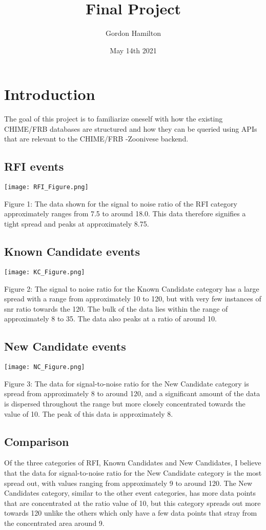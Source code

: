 \documentclass{article}
\title{Final Project}
\author{Gordon Hamilton}
\date{May 14th 2021}
\begin{document}
\maketitle

\section{Introduction}

The goal of this project is to familiarize oneself with how the existing CHIME/FRB databases are structured and how they can be queried using APIs that are relevant to the CHIME/FRB -Zoonivese backend.

\subsection{RFI events}
\texttt{[image: RFI\_Figure.png]}
\caption{Figure 1: The data shown for the signal to noise ratio of the RFI category approximately ranges from 7.5 to around 18.0. This data therefore signifies a tight spread and peaks at approximately 8.75.}

\pagebreak

\subsection{Known Candidate events}
\texttt{[image: KC\_Figure.png]}
\caption{Figure 2: The signal to noise ratio for the Known Candidate category has a large spread with a range from approximately 10 to 120, but with very few instances of snr ratio towards the 120. The bulk of the data lies within the range of approximately 8 to 35. The data also peaks at a ratio of around 10.}

\subsection{New Candidate events}
\texttt{[image: NC\_Figure.png]}
\caption{Figure 3: The data for signal-to-noise ratio for the New Candidate category is spread from approximately 8 to around 120, and a significant amount of the data is dispersed throughout the range but more closely concentrated towards the value of 10. The peak of this data is approximately 8.\\}

\subsection{Comparison}
Of the three categories of RFI, Known Candidates and New Candidates, I believe that the data for signal-to-noise ratio for the New Candidate category is the most spread out, with values ranging from approximately 9 to around 120. The New Candidates category, similar to the other event categories, has more data points that are concentrated at the ratio value of 10, but this category spreads out more towards 120 unlike the others which only have a few data points that stray from the concentrated area around 9.
\end{document}
